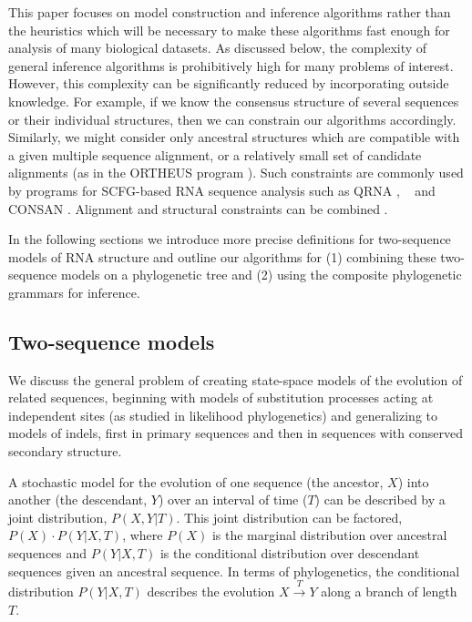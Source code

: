 \documentclass[10pt]{article}
\begin{document}
This paper focuses on model construction and inference algorithms
rather than the heuristics which will be necessary to make these
algorithms fast enough for analysis of many biological datasets.
As discussed below, the complexity of general inference algorithms is
prohibitively high for many problems of interest.
However, this complexity can be significantly
reduced by incorporating outside knowledge.  For example, if we know
the consensus structure of several sequences or their individual
structures, then we can constrain our algorithms accordingly.
Similarly, we might consider only ancestral structures which are
compatible with a given multiple sequence alignment, or a relatively small set of candidate alignments (as in the ORTHEUS program \cite{PatenHolmesBirney2008}). 
Such constraints are
commonly used by programs for SCFG-based RNA sequence analysis such as QRNA \cite{RivasEddy2001}, \stemloc\ \cite{Holmes2005} and CONSAN \cite{DowellEddy2006}.
Alignment and structural constraints can be combined \cite{Holmes2005}.


In the following sections we introduce more precise definitions for two-sequence
models of RNA structure and outline our algorithms for
(1) combining these two-sequence models on a phylogenetic tree and
(2) using the composite phylogenetic grammars for inference.



\subsection*{Two-sequence models} 

We discuss the general problem of creating state-space models of the
evolution of related sequences, beginning with models of substitution processes acting at independent
sites (as studied in likelihood phylogenetics) and generalizing to models of
indels, first in primary sequences and then in sequences with
conserved secondary structure.

A stochastic model for the evolution of one sequence (the ancestor, $X$) into
another (the descendant, $Y$) over an interval of time ($T$) can be described by a
joint distribution, $P (X, Y | T)$.
This joint distribution can be factored, $P (X) \cdot P (Y | X, T)$, 
where $P(X)$ is the marginal distribution over ancestral sequences
and $P(Y | X, T)$ is the conditional distribution over descendant sequences given an ancestral sequence.
In terms of phylogenetics, the conditional distribution $P(Y | X, T)$ describes the evolution $X \stackrel{T}{\to} Y$
along a branch of length $T$.
\end{document}
